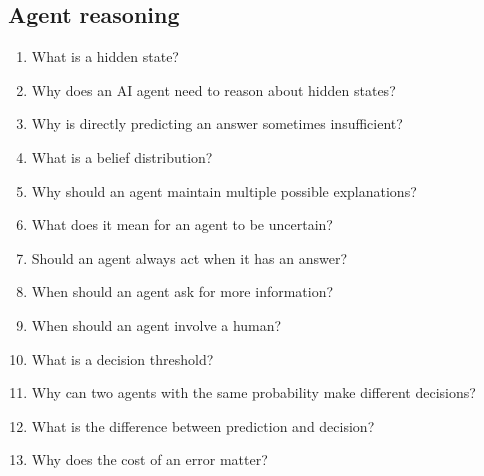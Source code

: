 \documentclass[11pt,a4paper]{article}
\begin{document}
\subsection{Agent reasoning}
\begin{enumerate}[itemsep=1pt,start=16]
\item What is a hidden state?
\item Why does an AI agent need to reason about hidden states?
\item Why is directly predicting an answer sometimes insufficient?
\item What is a belief distribution?
\item Why should an agent maintain multiple possible explanations?
\item What does it mean for an agent to be uncertain?
\item Should an agent always act when it has an answer?
\item When should an agent ask for more information?
\item When should an agent involve a human?
\item What is a decision threshold?
\item Why can two agents with the same probability make different decisions?
\item What is the difference between prediction and decision?
\item Why does the cost of an error matter?
\end{enumerate}
\end{document}
